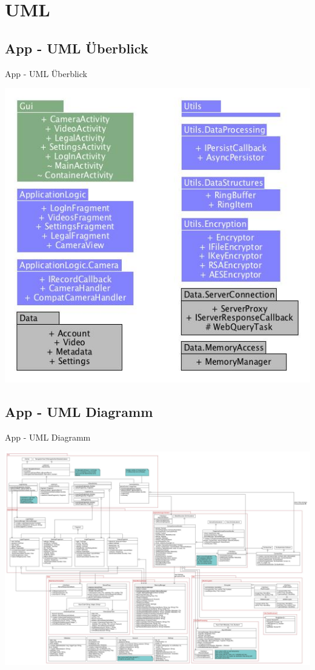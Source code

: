 \documentclass[19pt]{beamer}
\begin{document}
\section{UML}
\subsection{App - UML \"{U}berblick}
\begin{frame}{App - UML \"{U}berblick}
\begin{center}
\includegraphics[scale=0.4]{resources/modules_overview_app.jpg}
\end{center}
\end{frame}
\subsection{App - UML Diagramm}
\begin{frame}{App - UML Diagramm}
\begin{center}
\includegraphics[scale=0.093]{resources/UMLAndroidApp.jpg}
\end{center}
\end{frame}
\end{document}
